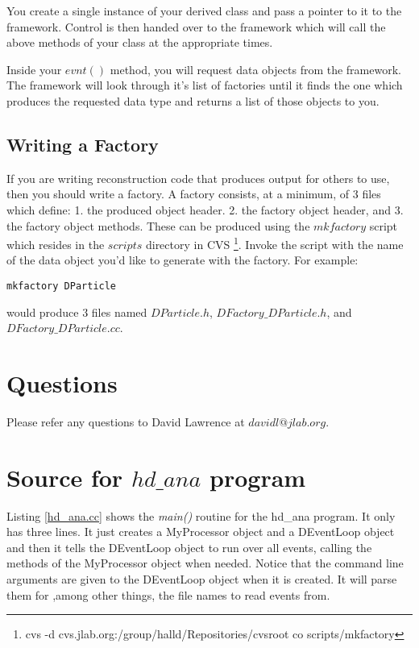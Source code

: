 \documentclass[12pt]{article}
\begin{document}
You create a single instance of your derived class and pass a pointer
to it to the framework. Control is then
handed over to the framework which will call the above methods of your
class at the appropriate times.

Inside your $evnt()$ method, you will request data objects from the 
framework. The framework will look through it's list of factories
until it finds the one which produces the requested data type and returns
a list of those objects to you.

\subsection{Writing a Factory}
\label{factory}
If you are writing reconstruction code that produces output for others
to use, then you should write a factory. A factory consists, at a
minimum, of 3 files which define: 1. the produced object header.
2. the factory object header, and  3. the factory object methods.
These can be produced using the $mkfactory$ script which resides in
the $scripts$ directory in CVS
\footnote{cvs -d cvs.jlab.org:/group/halld/Repositories/cvsroot co scripts/mkfactory}.
Invoke the script with the name of the data object you'd like to
generate with the factory. For example:

\begin{lstlisting}[frame=shadowbox,backgroundcolor=\color{cmdbkgd}]
mkfactory DParticle
\end{lstlisting}

would produce 3 files named $DParticle.h$, $DFactory\_DParticle.h$,
and $DFactory\_DParticle.cc$.



\section{Questions}
Please refer any questions to David Lawrence at $davidl@jlab.org$.

\newpage
\appendix
\section{Source for $hd\_ana$ program}
\label{hd_ana_src}

Listing \ref{hd_ana.cc} shows the {\it main()} routine for the
hd\_ana program. It only has three lines. It just creates a MyProcessor
object and a DEventLoop object and then it tells the DEventLoop object
to run over all events, calling the methods of the MyProcessor object
when needed. Notice that the command line arguments are given to 
the DEventLoop object when it is created. It will parse them for
,among other things, the file names to read events from.
\end{document}
